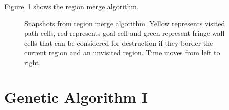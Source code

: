 Figure~\ref{fig:region-merge} shows the region merge algorithm.\\

\begin{figure}[!h]
\centering
            \hfill
            \hfill
            \hfill
            \hfill
            \caption{Snapshots from region merge algorithm. Yellow represents visited path cells, red represents goal cell and green represent fringe wall cells that can be considered for destruction if they border the current region and an unvisited region. Time moves from left to right.}
\label{fig:region-merge}
\end{figure}


\section{Genetic Algorithm I}\label{sec:ga-1}

